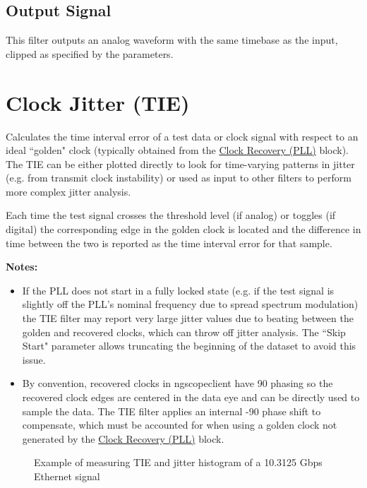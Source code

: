 \subsection{Output Signal}

This filter outputs an analog waveform with the same timebase as the input, clipped as specified by the parameters.

\pagebreak
\section{Clock Jitter (TIE)}

Calculates the time interval error of a test data or clock signal with respect to an ideal ``golden" clock (typically
obtained from the \hyperref[filter:cdrpll]{Clock Recovery (PLL)} block). The TIE can be either plotted directly to look
for time-varying patterns in jitter (e.g. from transmit clock instability) or used as input to other filters to perform
more complex jitter analysis.

Each time the test signal crosses the threshold level (if analog) or toggles (if digital) the corresponding edge in the
golden clock is located and the difference in time between the two is reported as the time interval error for that
sample.

\textbf{Notes:}
\begin{itemize}
\item If the PLL does not start in a fully locked state (e.g. if the test signal is slightly off the PLL's nominal
frequency due to spread spectrum modulation) the TIE filter may report very large jitter values due to beating between
the golden and recovered clocks, which can throw off jitter analysis. The ``Skip Start" parameter allows truncating the
beginning of the dataset to avoid this issue.
\item By convention, recovered clocks in ngscopeclient have 90\textdegree{} phasing so the recovered clock edges are
centered in the data eye and can be directly used to sample the data. The TIE filter applies an internal
-90\textdegree{} phase shift to compensate, which must be accounted for when using a golden clock not generated by the
\hyperref[filter:cdrpll]{Clock Recovery (PLL)} block.
\end{itemize}

\begin{figure}[h]
\centering
{}
\caption{Example of measuring TIE and jitter histogram of a 10.3125 Gbps Ethernet signal}
\label{filter_tie}
\end{figure}

